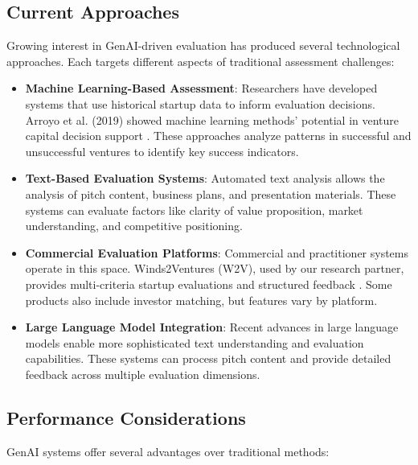 \subsection{Current Approaches}\label{subsec:current-approaches}
Growing interest in GenAI-driven evaluation has produced several technological approaches. Each targets different aspects of traditional assessment challenges:

\begin{itemize}
    \item \textbf{Machine Learning-Based Assessment}: Researchers have developed systems that use historical startup data to inform evaluation decisions. Arroyo et al. (2019) showed machine learning methods' potential in venture capital decision support \cite{Arroyo2019}. These approaches analyze patterns in successful and unsuccessful ventures to identify key success indicators.

    \item \textbf{Text-Based Evaluation Systems}: Automated text analysis allows the analysis of pitch content, business plans, and presentation materials. These systems can evaluate factors like clarity of value proposition, market understanding, and competitive positioning.

    \item \textbf{Commercial Evaluation Platforms}: Commercial and practitioner systems operate in this space. Winds2Ventures (W2V), used by our research partner, provides multi-criteria startup evaluations and structured feedback \cite{w2v}. Some products also include investor matching, but features vary by platform.

    \item \textbf{Large Language Model Integration}: Recent advances in large language models enable more sophisticated text understanding and evaluation capabilities. These systems can process pitch content and provide detailed feedback across multiple evaluation dimensions.
\end{itemize}

\subsection{Performance Considerations}\label{subsec:performance-considerations}
GenAI systems offer several advantages over traditional methods:

